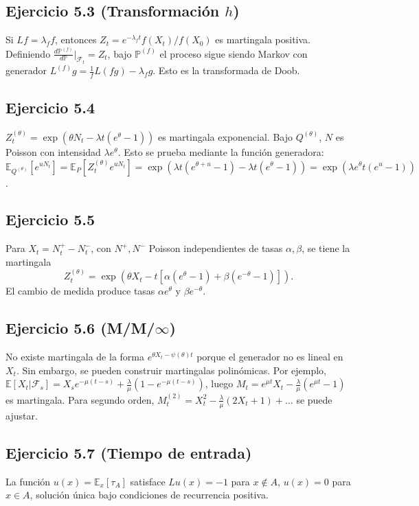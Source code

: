 \documentclass[letterpaper, 12pt]{article}
\newcommand{\E}{\mathbb{E}}
\renewcommand{\P}{\mathbb{P}}
\newcommand{\F}{\mathcal{F}}
\newcommand{\1}{\mathbbm{1}}
\begin{document}
    \subsection{Ejercicio 5.3 (Transformaci\'on $h$)}
    Si $Lf=\lambda_f f$, entonces $Z_t=e^{-\lambda_f t}f(X_t)/f(X_0)$ es martingala positiva. Definiendo $\frac{d\P^{(f)}}{d\P}|_{\F_t}=Z_t$, bajo $\P^{(f)}$ el proceso sigue siendo Markov con generador $L^{(f)}g = \frac1f L(fg)-\lambda_f g$. Esto es la transformada de Doob.

    \subsection{Ejercicio 5.4}
    $Z_t^{(\theta)}=\exp(\theta N_t-\lambda t(e^\theta-1))$ es martingala exponencial. Bajo $Q^{(\theta)}$, $N$ es Poisson con intensidad $\lambda e^\theta$. Esto se prueba mediante la funci\'on generadora: $\E_{Q^{(\theta)}}[e^{u N_t}]=\E_P[Z_t^{(\theta)}e^{u N_t}]=\exp(\lambda t(e^{\theta+u}-1)-\lambda t(e^\theta-1))=\exp(\lambda e^\theta t(e^u-1))$.

    \subsection{Ejercicio 5.5}
    Para $X_t=N^+_t-N^-_t$, con $N^+,N^-$ Poisson independientes de tasas $\alpha,\beta$, se tiene la martingala
    \[
    Z_t^{(\theta)}=\exp(\theta X_t-t[\alpha(e^\theta-1)+\beta(e^{-\theta}-1)]).
    \]
    El cambio de medida produce tasas $\alpha e^\theta$ y $\beta e^{-\theta}$.

    \subsection{Ejercicio 5.6 (M/M/$\infty$)}
    No existe martingala de la forma $e^{\theta X_t-\psi(\theta)t}$ porque el generador no es lineal en $X_t$. Sin embargo, se pueden construir martingalas polin\'omicas. Por ejemplo, $\E[X_t|\F_s]=X_s e^{-\mu(t-s)}+\frac{\lambda}{\mu}(1-e^{-\mu(t-s)})$, luego $M_t=e^{\mu t}X_t-\frac{\lambda}{\mu}(e^{\mu t}-1)$ es martingala. Para segundo orden, $M_t^{(2)}=X_t^2-\frac{\lambda}{\mu}(2X_t+1)+\dots$ se puede ajustar.

    \subsection{Ejercicio 5.7 (Tiempo de entrada)}
    La funci\'on $u(x)=\E_x[\tau_A]$ satisface $Lu(x)=-1$ para $x\notin A$, $u(x)=0$ para $x\in A$, soluci\'on \'unica bajo condiciones de recurrencia positiva.
\end{document}
